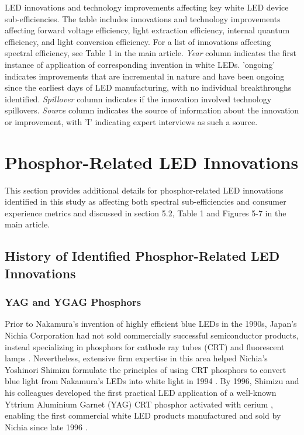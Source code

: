 \documentclass[10pt]{article}
\begin{document}
\begin{table}[H]
    \caption{LED innovations and technology improvements affecting key white LED device sub-efficiencies. The table includes innovations and technology improvements affecting forward voltage efficiency, light extraction efficiency, internal quantum efficiency, and light conversion efficiency. For a list of innovations affecting spectral efficiency, see Table 1 in the main article. \textit{Year} column indicates the first instance of application of corresponding invention in white LEDs. 'ongoing' indicates improvements that are incremental in nature and have been ongoing since the earliest days of LED manufacturing, with no individual breakthroughs identified. \textit{Spillover} column indicates if the innovation involved technology spillovers. \textit{Source} column indicates the source of information about the innovation or improvement, with 'I' indicating expert interviews as such a source.}
    \label{tab:innovations}
\end{table}

\section{Phosphor-Related LED Innovations}
\label{sec:innovation_phosphor}

This section provides additional details for phosphor-related LED innovations identified in this study as affecting both spectral sub-efficiencies and consumer experience metrics and discussed in section 5.2, Table 1 and Figures 5-7 in the main article.

\subsection{History of Identified Phosphor-Related LED Innovations}

\subsubsection{YAG and YGAG Phosphors}

Prior to Nakamura’s invention of highly efficient blue LEDs in the 1990s, Japan’s Nichia Corporation had not sold commercially successful semiconductor products, instead specializing in phosphors for cathode ray tubes (CRT) and fluorescent lamps \cite{nakamura2013blue}  . Nevertheless, extensive firm expertise in this area helped Nichia’s Yoshinori Shimizu formulate the principles of using CRT phosphors to convert blue light from Nakamura’s LEDs into white light in 1994 \cite{shimizu1994sheet}\cite{cho2017white}. By 1996, Shimizu and his colleagues developed \cite{bando1996}\cite{shimizu1999light} the first practical LED application of a well-known Yttrium Aluminium Garnet (YAG) CRT phosphor activated with cerium \cite{blasse1967new}, enabling the first commercial white LED products manufactured and sold by Nichia since late 1996 \cite{bando1998development}\cite{cho2017white}. 
\end{document}
